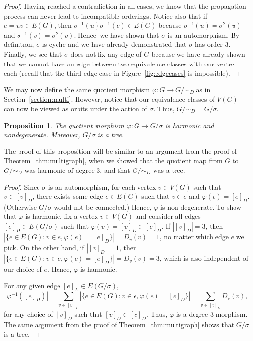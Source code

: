 \documentclass[10pt]{amsart}
\newtheorem{prop}[theorem]{Proposition}
\begin{document}
\begin{proof}
Having reached a contradiction in all cases, we know that the propagation process can never lead to incompatible orderings. Notice also that if $e = uv \in E(G)$, then $\sigma^{-1}(u)\sigma^{-1}(v) \in E(G)$ because $\sigma^{-1}(u) = \sigma^2(u)$ and $\sigma^{-1}(v) = \sigma^2(v)$. Hence, we have shown that $\sigma$ is an automorphism. By definition, $\sigma$ is cyclic and we have already demonstrated that $\sigma$ has order $3$. Finally, we see that $\sigma$ does not fix any edge of $G$ because we have already shown that we cannot have an edge between two equivalence classes with one vertex each (recall that the third edge case in Figure~\ref{fig:edgecases} is impossible).
\end{proof}

We may now define the same quotient morphism $\varphi: G \to G / \sim_D$ as in Section~\ref{section:multi}. However, notice that our equivalence classes of $V(G)$ can now be viewed as orbits under the action of $\sigma$. Thus, $G / \sim_D = G / \sigma$. 



\begin{prop}
\label{prop:quotient}
The quotient morphism $\varphi: G \to G / \sigma$ is harmonic and nondegenerate. Moreover, $G/\sigma$ is a tree.
\end{prop}

The proof of this proposition will be similar to an argument from the proof of Theorem~\ref{thm:multigraph}, when we showed that the quotient map from $G$ to $G/\sim_D$ was harmonic of degree $3$, and that $G/\sim_D$ was a tree.

\begin{proof} Since $\sigma$ is an automorphism, for each vertex $v \in V(G)$ such that $v \in [v]_D$, there exists some edge $e \in E(G)$ such that $v \in e$ and $\varphi(e) = [e]_D$. (Otherwise $G/\sigma$ would not be connected.) Hence, $\varphi$ is non-degenerate. To show that $\varphi$ is harmonic, fix a vertex $v \in V(G)$ and consider all edges $[e]_D \in E(G/\sigma)$ such that $\varphi(v) = [v]_D \in [e]_D$. If $\left| [v]_D \right| = 3$, then $| \{e \in E(G) : v \in e, \varphi(e) = [e]_D \}| = D_v(v) = 1$, no matter which edge $e$ we pick. On the other hand, if $\left| [v]_D \right| = 1$, then $| \{e \in E(G) : v \in e, \varphi(e) = [e]_D \}| = D_v(v) = 3$, which is also independent of our choice of $e$. Hence, $\varphi$ is harmonic. 

For any given edge $[e]_D \in E(G/\sigma)$, 
\[
|\varphi^{-1}([e]_D)| = \sum_{v \in [v]_D} |\{ e \in E(G) : v \in e, \varphi(e) = [e]_D \}| = \sum_{v \in [v]_D} D_v(v),
\]
for any choice of $[v]_D$ such that $[v]_D \in [e]_D$. Thus, $\varphi$ is a degree $3$ morphism. The same argument from the proof of Theorem~\ref{thm:multigraph} shows that $G / \sigma$ is a tree. 
\end{proof}
\end{document}
